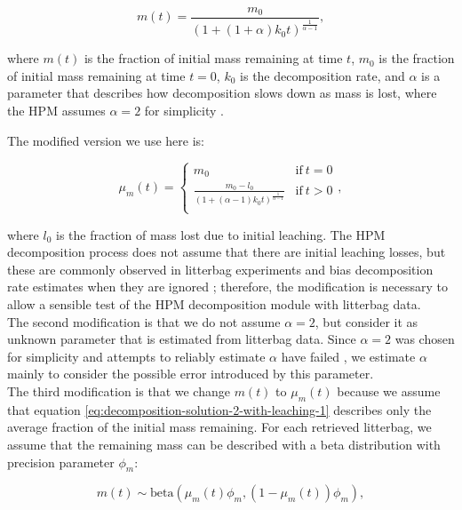 \documentclass[esd, manuscript]{copernicus}
\begin{document}
\begin{equation}
m(t) = \frac{m_0}{(1 + (1 + \alpha) k_0 t)^{\frac{1}{\alpha - 1}}},
\label{eq:hpm-remaining-mass-original}
\end{equation}

where \(m(t)\) is the fraction of initial mass remaining at time \(t\), \(m_0\) is the fraction of initial mass remaining at time \(t=0\), \(k_0\) is the decomposition rate, and \(\alpha\) is a parameter that describes how decomposition slows down as mass is lost, where the HPM assumes \(\alpha = 2\) for simplicity \citep{Frolking.2001, Frolking.2010}.

The modified version we use here is:

\begin{equation}
\mu_m(t) = \begin{cases}
m_0 & \mathrm{if}~t=0\\
\frac{m_0 - l_0}{(1 + (\alpha - 1) k_0 t)^{\frac{1}{\alpha - 1}}} &     \mathrm{if}~t>0\\
\end{cases}
\label{eq:decomposition-solution-2-with-leaching-1},
\end{equation}

where \(l_0\) is the fraction of mass lost due to initial leaching. The HPM decomposition process does not assume that there are initial leaching losses, but these are commonly observed in litterbag experiments and bias decomposition rate estimates when they are ignored \citep{Yu.2001, Teickner.2025}; therefore, the modification is necessary to allow a sensible test of the HPM decomposition module with litterbag data.\\
The second modification is that we do not assume \(\alpha=2\), but consider it as unknown parameter that is estimated from litterbag data. Since \(\alpha=2\) was chosen for simplicity and attempts to reliably estimate \(\alpha\) have failed \citep[e.g.,][]{Clymo.1998, Frolking.2001, Teickner.2025}, we estimate \(\alpha\) mainly to consider the possible error introduced by this parameter.\\
The third modification is that we change \(m(t)\) to \(\mu_m(t)\) because we assume that equation \eqref{eq:decomposition-solution-2-with-leaching-1} describes only the average fraction of the initial mass remaining. For each retrieved litterbag, we assume that the remaining mass can be described with a beta distribution with precision parameter \(\phi_m\):

\begin{equation}
m(t) \sim \text{beta}(\mu_m(t) \phi_m, (1 - \mu_m(t)) \phi_m)
\label{eq:decomposition-solution-2-with-leaching-2},
\end{equation}
\end{document}
